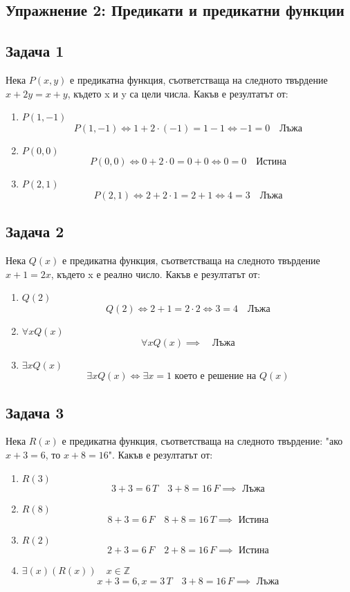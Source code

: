 \documentclass[fleqn, 12pt]{article}
\theoremstyle{definition}
\begin{document}
\newpage
\subsection{Упражнение 2: Предикати и предикатни функции}

\subsection*{Задача 1}
Нека $P(x,y)$ е  предикатна  функция,  съответстваща  на  следното твърдение $x + 2y = x+y$, където x и y са цели числа.  Какъв е резултатът от:
\begin{enumerate}
\item $P(1,-1)$
$$P(1,-1) \Leftrightarrow 1 + 2 \cdot (-1) = 1 - 1  \Leftrightarrow -1 = 0 \quad \text{Лъжа}$$  
\item $P(0,0)$
$$P(0,0) \Leftrightarrow 0 + 2 \cdot 0= 0 + 0  \Leftrightarrow 0 = 0 \quad \text{Истина}$$  
\item $P(2,1)$
$$P(2,1) \Leftrightarrow 2 + 2 \cdot 1 = 2 + 1 \Leftrightarrow 4 = 3 \quad \text{Лъжа}$$  
\end{enumerate}

\subsection*{Задача 2}
Нека $Q(x)$ е предикатна функция, съответстваща на следното твърдение $x+1 = 2x$, където x е реално число.  Какъв е резултатът от:
\begin{enumerate}
\item $Q(2)$
$$Q(2) \Leftrightarrow 2+1 = 2 \cdot 2 \Leftrightarrow 3 = 4 \quad \text{Лъжа}$$  
\item $\forall x Q(x)$
$$\forall x Q(x) \implies \quad \text{Лъжа}$$  
\item $\exists x Q(x)$
$$\exists x Q(x) \Leftrightarrow \exists x = 1 \text{ което е решение на } Q(x)$$  
\end{enumerate}

\subsection*{Задача 3}
Нека $R(x)$ е предикатна функция, съответстваща на следното твърдение: "ако $x+3 = 6$, то $x + 8 = 16$". Какъв е резултатът от:
\begin{enumerate}
\item $R(3)$
$$3 + 3 = 6 \, T \quad 3+8 = 16 \, F \implies \text{ Лъжа}$$  
\item $R(8)$
$$8 + 3 = 6 \, F \quad 8+8 = 16 \, T \implies \text{ Истина}$$  
\item $R(2)$
$$2 + 3 = 6 \, F \quad 2+8 = 16 \, F \implies \text{ Истина}$$  
\item $\exists (x)(R(x)) \quad x \in \mathbb{Z}$
$$x + 3 = 6, x=3 \, T \quad 3+8 = 16 \, F \implies \text{ Лъжа}$$  
\end{enumerate}
\end{document}
